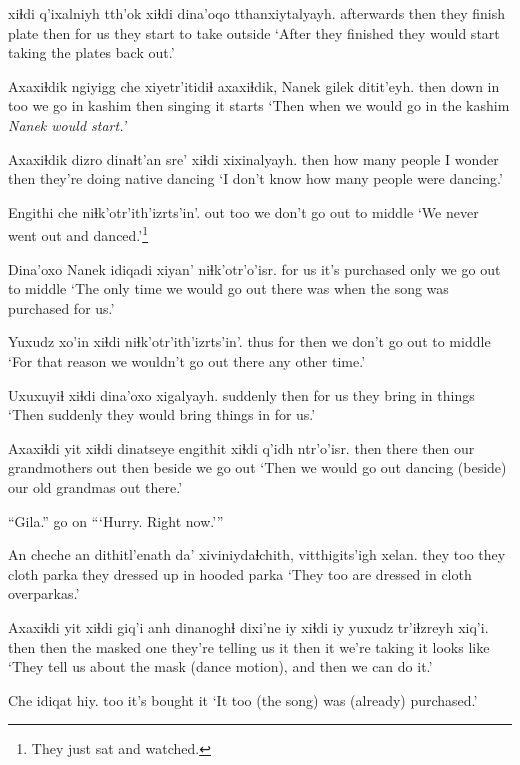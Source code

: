 \documentclass[12pt]{article}
\begin{document}
 xiɬdi q'ixalniyh tth'ok xiɬdi dina'oqo tthanxiytalyayh.
afterwards  then {they finish} plate then {for us} {they start to take outside}
\glt `After they finished they would start taking the plates back out.'
\glend

\gll Axaxiɬdik ngiyigg che xiyetr'itidiɬ axaxiɬdik, Nanek gilek ditit'eyh.
then      {down in} too {we go in kashim} then       {} singing {it starts}
\glt `Then when we would go in the kashim \em Nanek \em would start.'
\glend

\gll Axaxiɬdik dizro dinaɬt'an sre' xiɬdi xixinalyayh.
then      {}    {how many people} {I wonder} then {they're doing native dancing}
\glt `I don't know how many people were dancing.'
\glend

\gll Engithi che {niɬk'otr'ith'izrts'in'.}
out    too {we don't go out to middle}
\glt `We never went out {and danced}.'\footnote{They just sat and watched.}
\glend

\gll Dina'oxo {Nanek} {idiqadi} xiyan' niɬk'otr'o'isr.
{for us}  {} {it's purchased} only {we go out to middle}
\glt `The only time we would go out there was when the song was purchased for us.' 
\glend

\gll Yuxudz xo'in xiɬdi {niɬk'otr'ith'izrts'in'.}
thus   for   then  {we don't go out to middle}
\glt `For that reason we wouldn't go out there any other time.'
\glend

\gll Uxuxuyiɬ xiɬdi dina'oxo xigalyayh.
suddenly then {for us} {they bring in things}
\glt `Then suddenly they would bring things in for us.'
\glend

\gll Axaxiɬdi yit xiɬdi dinatseye engithit xiɬdi q'idh ntr'o'isr.
then    there then {our grandmothers} out then beside {we go out}
\glt `Then we would go out dancing (beside) our old grandmas out there.'
\glend

\gll ``Gila.''
{{go on}}
\glt ```Hurry. Right now.'''
\glend

\gll An cheche an dithitl'enath da' xiviniydaɬchith, {vitthigits'igh xelan.}
they too they cloth parka      {they dressed up in} {hooded parka}
\glt `They too are dressed in cloth overparkas.'
\glend

\gll Axaxiɬdi {yit xiɬdi} {giq'i anh} {dinanoghɬ dixi'ne} iy xiɬdi iy yuxudz tr'iɬzreyh xiq'i.
then     then {the masked one}  {they're telling us} it then it {} {we're taking} {it looks like}
\glt `They tell us about the mask (dance motion), and then we can do it.'
\glend

\gll Che idiqat hiy.
too {it's bought} it
\glt `It too (the song) was (already) purchased.'
\glend
\end{document}
